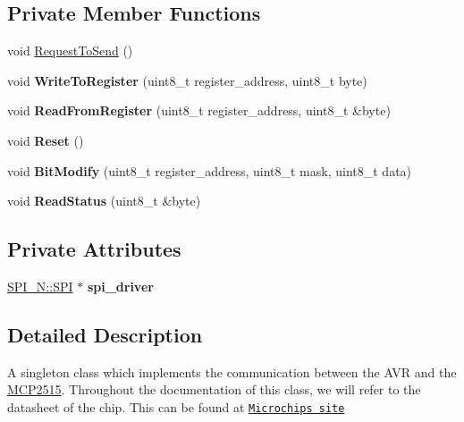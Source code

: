 \subsection*{Private Member Functions}
\begin{DoxyCompactItemize}
\item 
void \hyperlink{class_m_c_p2515_a5a218199ca1dfcb25cb95890bc0220fc}{Request\-To\-Send} ()
\item 
\hypertarget{class_m_c_p2515_adbc005a5975b77b0aef74363f3832f9b}{void {\bfseries Write\-To\-Register} (uint8\-\_\-t register\-\_\-address, uint8\-\_\-t byte)}\label{class_m_c_p2515_adbc005a5975b77b0aef74363f3832f9b}

\item 
\hypertarget{class_m_c_p2515_a09ef6973daccbf868d89986e727cfa1b}{void {\bfseries Read\-From\-Register} (uint8\-\_\-t register\-\_\-address, uint8\-\_\-t \&byte)}\label{class_m_c_p2515_a09ef6973daccbf868d89986e727cfa1b}

\item 
\hypertarget{class_m_c_p2515_aa4d4138b984dc87116cf72ae104acb70}{void {\bfseries Reset} ()}\label{class_m_c_p2515_aa4d4138b984dc87116cf72ae104acb70}

\item 
\hypertarget{class_m_c_p2515_aa9a35fe139adf1fccaaceec561544c14}{void {\bfseries Bit\-Modify} (uint8\-\_\-t register\-\_\-address, uint8\-\_\-t mask, uint8\-\_\-t data)}\label{class_m_c_p2515_aa9a35fe139adf1fccaaceec561544c14}

\item 
\hypertarget{class_m_c_p2515_ae466f10eea5ccf0f36439757d4baf6b5}{void {\bfseries Read\-Status} (uint8\-\_\-t \&byte)}\label{class_m_c_p2515_ae466f10eea5ccf0f36439757d4baf6b5}

\end{DoxyCompactItemize}
\subsection*{Private Attributes}
\begin{DoxyCompactItemize}
\item 
\hypertarget{class_m_c_p2515_a3a5ca0d606115f1551a06d871606540e}{\hyperlink{class_s_p_i___n_1_1_s_p_i}{S\-P\-I\-\_\-\-N\-::\-S\-P\-I} $\ast$ {\bfseries spi\-\_\-driver}}\label{class_m_c_p2515_a3a5ca0d606115f1551a06d871606540e}

\end{DoxyCompactItemize}


\subsection{Detailed Description}
A singleton class which implements the communication between the A\-V\-R and the \hyperlink{class_m_c_p2515}{M\-C\-P2515}. Throughout the documentation of this class, we will refer to the datasheet of the chip. This can be found at \href{http://ww1.microchip.com/downloads/en/DeviceDoc/21801G.pdf}{\tt Microchips site} 

